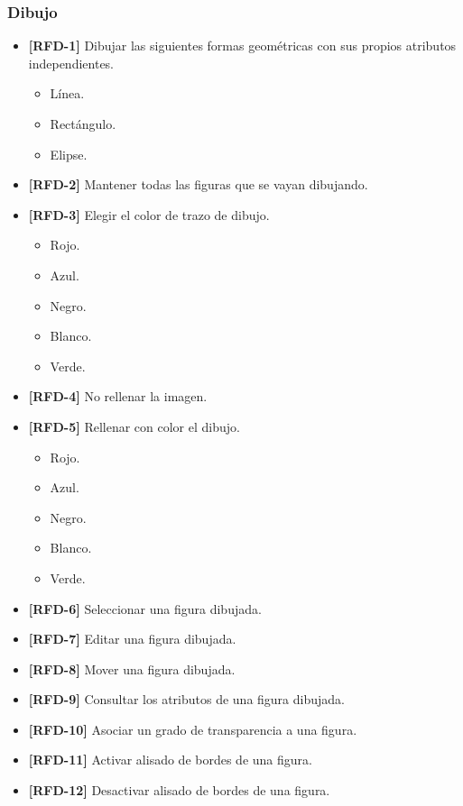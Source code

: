 \subsubsection{Dibujo}
\begin{itemize}
\item{\textbf{[RFD-1]} Dibujar las siguientes formas geométricas con sus propios atributos independientes.
\begin{itemize}
\item{Línea.}
\item{Rectángulo.}
\item{Elipse.}
\end{itemize}
}
\item{\textbf{[RFD-2]} Mantener todas las figuras que se vayan dibujando.}
\item{\textbf{[RFD-3]} Elegir el color de trazo de dibujo.
\begin{itemize}
\item{Rojo.}
\item{Azul.}
\item{Negro.}
\item{Blanco.}
\item{Verde.}
\end{itemize}
}
\item{\textbf{[RFD-4]} No rellenar la imagen.}
\item{\textbf{[RFD-5]} Rellenar con color el dibujo.
\begin{itemize}
\item{Rojo.}
\item{Azul.}
\item{Negro.}
\item{Blanco.}
\item{Verde.}
\end{itemize}
}
\item{\textbf{[RFD-6]} Seleccionar una figura dibujada.}
\item{\textbf{[RFD-7]} Editar una figura dibujada.}
\item{\textbf{[RFD-8]} Mover una figura dibujada.}
\item{\textbf{[RFD-9]} Consultar los atributos de una figura dibujada.}
\item{\textbf{[RFD-10]} Asociar un grado de transparencia a una figura.}
\item{\textbf{[RFD-11]} Activar alisado de bordes de una figura.}
\item{\textbf{[RFD-12]} Desactivar alisado de bordes de una figura.}
\end{itemize}
